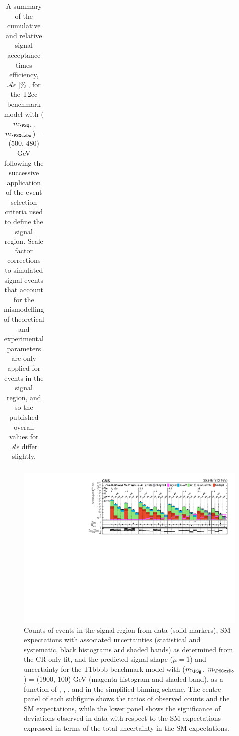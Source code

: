 \begin{table}[p]
\begin{center}
\begin{tabular}{lrr}
      \hline
        \end{tabular}
        \caption{A summary of the cumulative and relative signal acceptance times
        efficiency, $\mathcal{A}\epsilon$ [\%], for the
        T2cc benchmark model with ($m_{\PSQt}$, $m_{\PSGczDo}$) = (500, 480) GeV
        following the successive application of
        the event selection criteria used to define the signal region.  Scale
        factor corrections to simulated signal events that account for the
        mismodelling of theoretical and experimental parameters are only
        applied for events in the signal region, and so the published overall
        values for $\mathcal{A}\epsilon$ differ slightly.
}
        \label{tab:T2cc_500_480_MR_sig}
    \end{center}
\end{table}

\begin{figure}[p]
    \begin{center}
        \includegraphics[width=1.00\textwidth]{Supplementary/CMS-SUS-16-038_Figure-aux_029.pdf}
  \caption{Counts of events in the signal region from data (solid markers), SM expectations
    with associated uncertainties (statistical and systematic, black
    histograms and shaded bands) as determined from the CR-only fit,
    and the predicted signal shape ($\mu=1$) and uncertainty for the
        T1bbbb benchmark model with ($m_{\PSg}$, $m_{\PSGczDo}$) = (1900, 100) GeV
        (magenta histogram and shaded band),
    as a function of \njet, \nb, \scalht, and \mht in the simplified binning scheme.
    The centre panel of each subfigure shows the ratios of
    observed counts and the SM expectations, while the lower panel
    shows the significance of deviations observed in data with respect
    to the SM expectations expressed in terms of the total uncertainty
    in the SM expectations.  }
        \label{fig:T1bbbb_1900_100_MR_sig}
    \end{center}
\end{figure}


